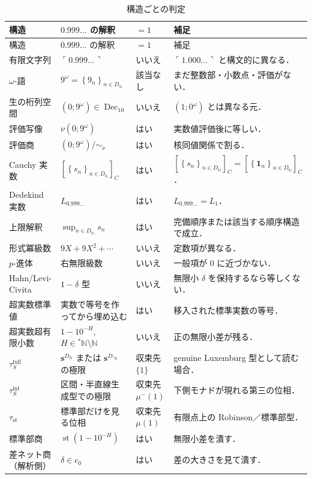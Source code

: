 \documentclass[a4paper,11pt]{ltjsarticle}
\theoremstyle{jpdef}
\theoremstyle{jpthm}
\newcommand{\N}{\mathbb{N}}
\newcommand{\Dec}{\operatorname{Dec}_{10}}
\newcommand{\st}{\operatorname{st}}
\newcommand{\DN}{D_{\N}}
\newcommand{\DStarN}{D_{{}^{\ast}\N}}
\newcommand{\seq}[2]{\left\{#1\right\}_{#2}}
\newcommand{\ulim}[1]{{}^{\ast}#1}
\newcommand{\taufullS}{\tau^{\mathrm{full}}_{S}}
\newcommand{\tauintS}{\tau^{\mathrm{int}}_{S}}
\newcommand{\taust}{\tau_{\mathrm{st}}}
\begin{document}
\begin{longtable}{L{30mm}L{48mm}C{25mm}L{50mm}}
\caption{構造ごとの判定}\label{tab:summary}\\
\toprule
構造 & \(0.999\ldots\) の解釈 & \(=1\) & 補足\\
\midrule
\endfirsthead
\toprule
構造 & \(0.999\ldots\) の解釈 & \(=1\) & 補足\\
\midrule
\endhead
有限文字列 & \(\ulcorner0.999\ldots\urcorner\) & いいえ & \(\ulcorner1.000\ldots\urcorner\) と構文的に異なる．\\
\(\omega\)-語 & \(9^\omega=\seq{9_n}{n\in\DN}\) & 該当なし & まだ整数部・小数点・評価がない．\\
生の桁列空間 & \((0;9^\omega)\in\Dec\) & いいえ & \((1;0^\omega)\) とは異なる元．\\
評価写像 & \(\nu(0;9^\omega)\) & はい & 実数値評価後に等しい．\\
評価商 & \((0;9^\omega)/\sim_\nu\) & はい & 核同値関係で割る．\\
Cauchy 実数 & \([\seq{s_n}{n\in\DN}]_C\) & はい & \([\seq{s_n}{n\in\DN}]_C=[\seq{\mathbf1_n}{n\in\DN}]_C\)．\\
Dedekind 実数 & \(L_{0.999\ldots}\) & はい & \(L_{0.999\ldots}=L_1\)．\\
上限解釈 & \(\sup_{n\in\DN}s_n\) & はい & 完備順序または該当する順序構造で成立．\\
形式冪級数 & \(9X+9X^2+\cdots\) & いいえ & 定数項が異なる．\\
\(p\)-進体 & 右無限級数 & いいえ & 一般項が \(0\) に近づかない．\\
Hahn/Levi-Civita & \(1-\delta\) 型 & いいえ & 無限小 \(\delta\) を保持するなら等しくない．\\
超実数標準値 & 実数で等号を作ってから埋め込む & はい & 移入された標準実数の等号．\\
超実数超有限小数 & \(1-10^{-H}\), \(H\in\ulim\N\setminus\N\) & いいえ & 正の無限小差が残る．\\
\(\taufullS\) & \(\mathbf s^{\DN}\) または \(\mathbf s^{\DStarN}\) の極限 & 収束先 \(\{1\}\) & genuine Luxemburg 型として読む場合．\\
\(\tauintS\) & 区間・半直線生成型での極限 & 収束先 \(\mu^-(1)\) & 下側モナドが現れる第三の位相．\\
\(\taust\) & 標準部だけを見る位相 & 収束先 \(\mu(1)\) & 有限点上の Robinson／標準部型．\\
標準部商 & \(\st(1-10^{-H})\) & はい & 無限小差を潰す．\\
差ネット商（解析側） & \(\delta\in c_0\) & はい & 差の大きさを見て潰す．\\

\end{longtable}
\end{document}
